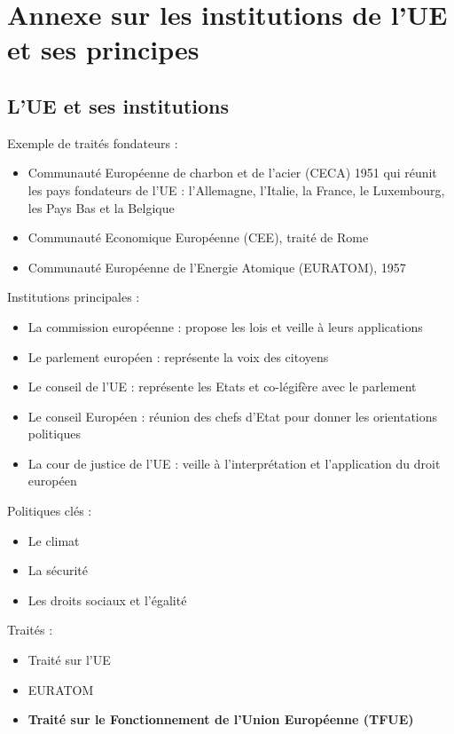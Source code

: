 \chapter{Annexe sur les institutions de l'UE et ses principes}
\newpage
\section{L'UE et ses institutions}
Exemple de traités fondateurs :
\begin{itemize}
    \item Communauté Européenne de charbon et de l'acier (CECA) 1951 qui réunit les pays fondateurs de l'UE : l'Allemagne, l'Italie, la France, le Luxembourg, les Pays Bas et la Belgique
    \item Communauté Economique Européenne (CEE), traité de Rome 
    \item Communauté Européenne de l'Energie Atomique (EURATOM), 1957 \newline
\end{itemize}

Institutions principales : 
\begin{itemize}
    \item La commission européenne : propose les lois et veille à leurs applications
    \item Le parlement européen : représente la voix des citoyens
    \item Le conseil de l'UE : représente les Etats et co-légifère avec le parlement
    \item Le conseil Européen : réunion des chefs d'Etat pour donner les orientations politiques
    \item La cour de justice de l'UE : veille à l'interprétation et l'application du droit européen \newline
\end{itemize}

\newpage
Politiques clés :
\begin{itemize}
    \item Le climat
    \item La sécurité
    \item Les droits sociaux et l'égalité \newline
\end{itemize}

Traités :
\begin{itemize}
    \item Traité sur l'UE
    \item EURATOM
    \item \textbf{Traité sur le Fonctionnement de l'Union Européenne (TFUE)} \newline
\end{itemize}
\newpage
